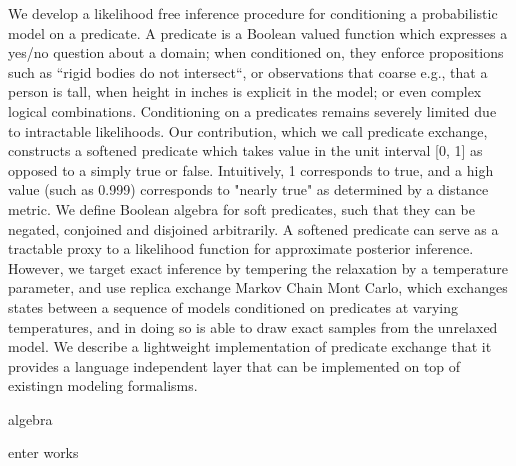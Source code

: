 We develop a likelihood free inference procedure for conditioning a probabilistic model on a predicate.
A predicate is a Boolean valued function which expresses a yes/no question about a domain; when conditioned on, they enforce propositions such as ``rigid bodies do not intersect``, or observations that coarse e.g., that a person is tall, when height in inches is explicit in the model; or even complex logical combinations.
Conditioning on a predicates remains severely limited due to intractable likelihoods.
Our contribution, which we call predicate exchange, 
constructs a softened predicate which takes value in the unit interval [0, 1] as opposed to a simply true or false. Intuitively, 1 corresponds to true, and a high value (such as 0.999) corresponds to "nearly true" as determined by a distance metric.
We define Boolean algebra for soft predicates,  such that they can be negated, conjoined and disjoined arbitrarily.
A softened predicate can serve as a tractable proxy to a likelihood function for approximate posterior inference.
However, we target exact inference by tempering the relaxation by a temperature parameter, and use replica exchange Markov Chain Mont Carlo, which exchanges states between a sequence of models conditioned on predicates at varying temperatures, and in doing so is able to draw exact samples from the unrelaxed model.
We describe a lightweight implementation of predicate exchange that it provides a language independent layer that can be implemented on top of existingn modeling formalisms.


% 

algebra

enter works
